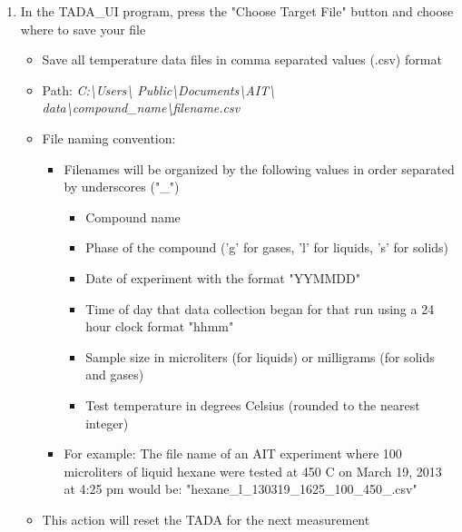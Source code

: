 \documentclass[letterpaper,11pt]{article}
\begin{document}
    \begin{enumerate}
  
    \item In the TADA\_UI program, press the "Choose Target File" button and 
        choose where to save your file
        \begin{itemize}
        \item Save all temperature data files in comma separated values (.csv) 
            format
        \item Path: \textit{C:\textbackslash Users\textbackslash 
            Public\textbackslash Documents\textbackslash AIT\textbackslash 
            data\textbackslash compound\_name\textbackslash filename.csv}
        \item File naming convention: 
            \begin{itemize}
            \item Filenames will be organized by the following values in order 
                separated by underscores ("\_")
                    \begin{itemize}
                    \item Compound name
                    \item Phase of the compound ('g' for gases, 'l' for liquids,
                        's' for solids)
                    \item Date of experiment with the format "YYMMDD"
                    \item Time of day that data collection began for that run
                        using a 24 hour clock format "hhmm"
                    \item Sample size in microliters (for liquids) or milligrams
                        (for solids and gases)
                    \item Test temperature in degrees Celsius (rounded to the 
                        nearest integer)
                    \end{itemize}
                    
            \item For example: The file name of an AIT experiment where 100 
                microliters of liquid hexane were tested at 450 \degree C on 
                March 19, 2013 at 4:25 pm would be: \newline
                "hexane\_l\_130319\_1625\_100\_450\_.csv"
            \end{itemize}    
        \item This action will reset the TADA for the next measurement        
        \end{itemize}
    

\end{enumerate}
\end{document}
